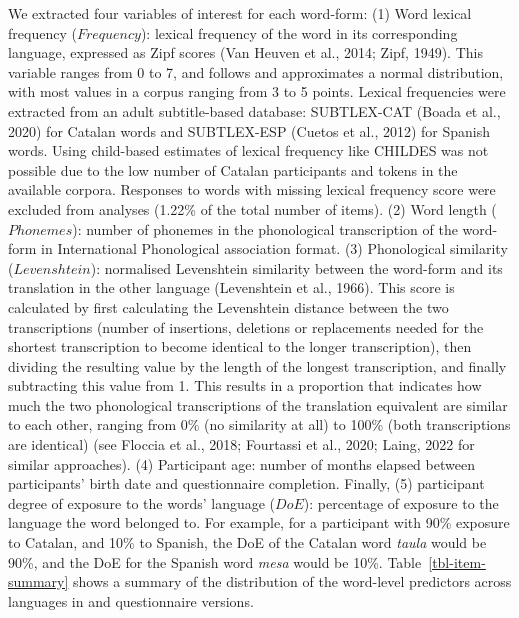 \documentclass[
  letterpaper,
  DIV=11,
  numbers=noendperiod]{scrartcl}
\begin{document}
We extracted four variables of interest for each word-form: (1) Word
lexical frequency (\(Frequency\)): lexical frequency of the word in its
corresponding language, expressed as Zipf scores (Van Heuven et al.,
2014; Zipf, 1949). This variable ranges from 0 to 7, and follows and
approximates a normal distribution, with most values in a corpus ranging
from 3 to 5 points. Lexical frequencies were extracted from an adult
subtitle-based database: SUBTLEX-CAT (Boada et al., 2020) for Catalan
words and SUBTLEX-ESP (Cuetos et al., 2012) for Spanish words. Using
child-based estimates of lexical frequency like CHILDES was not possible
due to the low number of Catalan participants and tokens in the
available corpora. Responses to words with missing lexical frequency
score were excluded from analyses (1.22\% of the total number of items).
(2) Word length (\(Phonemes\)): number of phonemes in the phonological
transcription of the word-form in International Phonological association
format. (3) Phonological similarity (\(Levenshtein\)): normalised
Levenshtein similarity between the word-form and its translation in the
other language (Levenshtein et al., 1966). This score is calculated by
first calculating the Levenshtein distance between the two
transcriptions (number of insertions, deletions or replacements needed
for the shortest transcription to become identical to the longer
transcription), then dividing the resulting value by the length of the
longest transcription, and finally subtracting this value from 1. This
results in a proportion that indicates how much the two phonological
transcriptions of the translation equivalent are similar to each other,
ranging from 0\% (no similarity at all) to 100\% (both transcriptions
are identical) (see Floccia et al., 2018; Fourtassi et al., 2020; Laing,
2022 for similar approaches). (4) Participant age: number of months
elapsed between participants' birth date and questionnaire completion.
Finally, (5) participant degree of exposure to the words' language
(\(DoE\)): percentage of exposure to the language the word belonged to.
For example, for a participant with 90\% exposure to Catalan, and 10\%
to Spanish, the DoE of the Catalan word \emph{taula} would be 90\%, and
the DoE for the Spanish word \emph{mesa} would be 10\%.
Table~\ref{tbl-item-summary} shows a summary of the distribution of the
word-level predictors across languages in and questionnaire versions.
\end{document}
